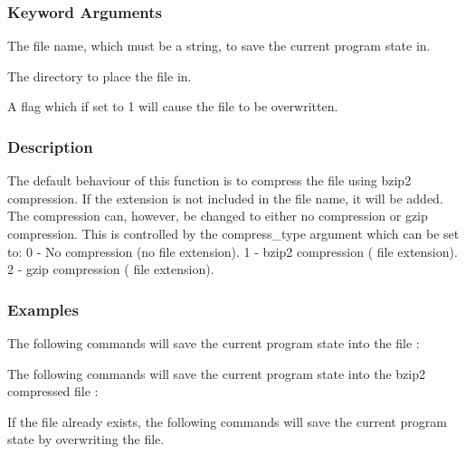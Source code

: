 \subsubsection{Keyword Arguments}


  The file name, which must be a string, to save the current program state in.

  The directory to place the file in.

  A flag which if set to 1 will cause the file to be overwritten.

\subsubsection{Description}

The default behaviour of this function is to compress the file using bzip2 compression.  If
the extension 
 is not included in the file name, it will be added.  The compression
can, however, be changed to either no compression or gzip compression.  This is controlled
by the compress\_type argument which can be set to:
    0 - No compression (no file extension).
    1 - bzip2 compression (
 file extension).
    2 - gzip compression (
 file extension).


\subsubsection{Examples}

The following commands will save the current program state into the file 
:





The following commands will save the current program state into the bzip2 compressed file
:







If the file 
 already exists, the following commands will save the current program
state by overwriting the file.

